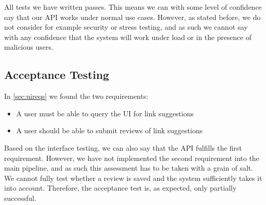 All tests we have written passes. This means we can with some level of confidence say that our API works under normal use cases. However, as stated before, we do not consider for example security or stress testing, and as such we cannot say with any confidence that the system will work under load or in the presence of malicious users.

\subsection{Acceptance Testing}
In \cref{sec:uireqs} we found the two requirements:
\begin{itemize}
	\item A user must be able to query the UI for link suggestions
	\item A user should be able to submit reviews of link suggestions
\end{itemize}

Based on the interface testing, we can also say that the API fulfills the first requirement. However, we have not implemented the second requirement into the main pipeline, and as such this assessment has to be taken with a grain of salt. We cannot fully test whether a review is saved and the system sufficiently takes it into account. Therefore, the acceptance test is, as expected, only partially successful. 
